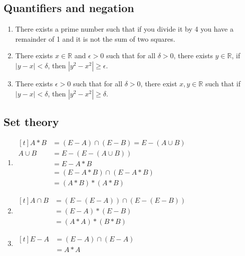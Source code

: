 \subsection{Quantifiers and negation}

\begin{exercise}{1}
  \begin{enumerate}
    \item There exists a prime number such that if you divide it by 4 you have
          a remainder of 1 and it is not the sum of two squares.

    \item There exists $x \in \mathbb{R}$ and $\epsilon > 0$ such that for all
          $\delta > 0$, there exists $y \in \mathbb{R}$, if $|y - x| < \delta$,
          then $|y^2 - x^2| \geq \epsilon$.

    \item There exists $\epsilon > 0$ such that for all $\delta > 0$, there
          exist $x, y \in \mathbb{R}$ such that if $|y - x| < \delta$, then
          $|y^2 - x^2| \geq \delta$.
  \end{enumerate}
\end{exercise}

\subsection{Set theory}

\begin{exercise}{1}
  \begin{enumerate}
    \item
    $\begin{aligned}[t]
    A * B    &= (E - A) \cap (E - B) = E - (A \cup B) \\
    A \cup B &= E - (E - (A \cup B)) \\
             &= E - A * B \\
             &= (E - A * B) \cap (E - A * B) \\
             &= (A * B) * (A * B)
    \end{aligned}$

    \item
    $\begin{aligned}[t]
    A \cap B &= (E - (E - A)) \cap (E - (E - B)) \\
             &= (E - A) * (E - B) \\
             &= (A * A) * (B * B)
    \end{aligned}$

    \item
    $\begin{aligned}[t]
    E - A &= (E - A) \cap (E-A) \\
          &= A * A
    \end{aligned}$
  \end{enumerate}
\end{exercise}

